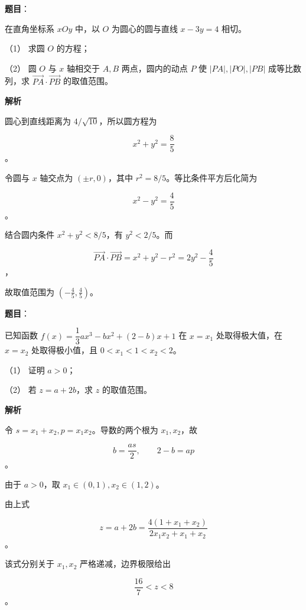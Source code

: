 \begin{answer}

\textbf{题目}：

在直角坐标系 $xOy$ 中，以 $O$ 为圆心的圆与直线 $x-3y=4$ 相切。

（1） 求圆 $O$ 的方程；

（2） 圆 $O$ 与 $x$ 轴相交于 $A,B$ 两点，圆内的动点 $P$ 使 $|PA|,|PO|,|PB|$ 成等比数列，求 $\overrightarrow{PA}\cdot\overrightarrow{PB}$ 的取值范围。

\textbf{解析}


圆心到直线距离为 $4/\sqrt{10}$，所以圆方程为

\nopagebreak[4]
\[
x^2+y^2=\frac85
\]
。


令圆与 $x$ 轴交点为 $(\pm r,0)$，其中 $r^2=8/5$。等比条件平方后化简为

\nopagebreak[4]
\[
x^2-y^2=\frac45
\]
。

结合圆内条件 $x^2+y^2<8/5$，有 $y^2<2/5$。而

\nopagebreak[4]
\[
\overrightarrow{PA}\cdot\overrightarrow{PB}=x^2+y^2-r^2=2y^2-\frac45
\]
，

故取值范围为 $\left(-\frac45,\frac45\right)$。



\end{answer}
\begin{answer}

\textbf{题目}：

已知函数 $f(x)=\dfrac13 ax^3-bx^2+(2-b)x+1$ 在 $x=x_1$ 处取得极大值，在 $x=x_2$ 处取得极小值，且 $0<x_1<1<x_2<2$。

（1） 证明 $a>0$；

（2） 若 $z=a+2b$，求 $z$ 的取值范围。

\textbf{解析}


令 $s=x_1+x_2,p=x_1x_2$。导数的两个根为 $x_1,x_2$，故

\nopagebreak[4]
\[
b=\frac{as}{2},\qquad 2-b=ap
\]
。

由于 $a>0$，取 $x_1\in(0,1),x_2\in(1,2)$。


由上式

\nopagebreak[4]
\[
z=a+2b=\frac{4(1+x_1+x_2)}{2x_1x_2+x_1+x_2}
\]
。

该式分别关于 $x_1,x_2$ 严格递减，边界极限给出

\nopagebreak[4]
\[
\frac{16}{7}<z<8
\]
。



\end{answer}